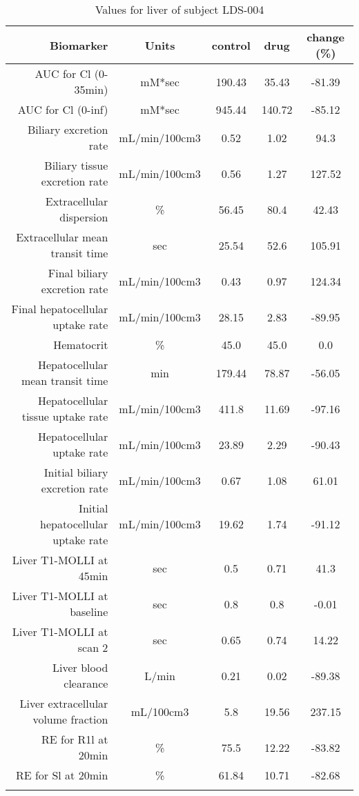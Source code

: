 \documentclass{epflreport}%
\begin{document}
%
\clearpage%
\begin{longtable}{rcccc}%
\hline%
Biomarker&Units&control&drug&change (\%)\\%
\hline%
AUC for Cl (0{-}35min)&mM*sec&190.43&35.43&{-}81.39\\%
AUC for Cl (0{-}inf)&mM*sec&945.44&140.72&{-}85.12\\%
Biliary excretion rate&mL/min/100cm3&0.52&1.02&94.3\\%
Biliary tissue excretion rate&mL/min/100cm3&0.56&1.27&127.52\\%
Extracellular dispersion&\%&56.45&80.4&42.43\\%
Extracellular mean transit time&sec&25.54&52.6&105.91\\%
Final biliary excretion rate&mL/min/100cm3&0.43&0.97&124.34\\%
Final hepatocellular uptake rate&mL/min/100cm3&28.15&2.83&{-}89.95\\%
Hematocrit&\%&45.0&45.0&0.0\\%
Hepatocellular mean transit time&min&179.44&78.87&{-}56.05\\%
Hepatocellular tissue uptake rate&mL/min/100cm3&411.8&11.69&{-}97.16\\%
Hepatocellular uptake rate&mL/min/100cm3&23.89&2.29&{-}90.43\\%
Initial biliary excretion rate&mL/min/100cm3&0.67&1.08&61.01\\%
Initial hepatocellular uptake rate&mL/min/100cm3&19.62&1.74&{-}91.12\\%
Liver T1{-}MOLLI at 45min&sec&0.5&0.71&41.3\\%
Liver T1{-}MOLLI at baseline&sec&0.8&0.8&{-}0.01\\%
Liver T1{-}MOLLI at scan 2&sec&0.65&0.74&14.22\\%
Liver blood clearance&L/min&0.21&0.02&{-}89.38\\%
Liver extracellular volume fraction&mL/100cm3&5.8&19.56&237.15\\%
RE for R1l at 20min&\%&75.5&12.22&{-}83.82\\%
RE for Sl at 20min&\%&61.84&10.71&{-}82.68\\%
\hline%
\caption{Values for liver of subject LDS-004} \\%
\end{longtable}%
\end{document}
